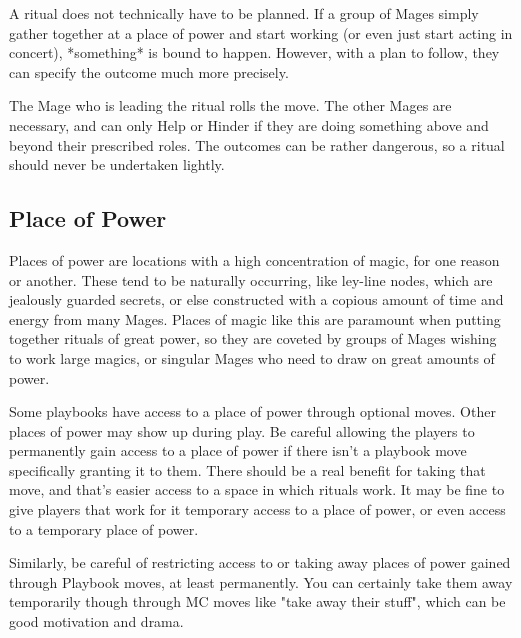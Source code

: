 \documentclass[
  oneside,
  statementpaper,
  9pt]{memoir}
\begin{document}
\begin{Player}
A ritual does not technically have to be planned. If a group of Mages simply gather together at a place of power and start working (or even just start acting in concert), *something* is bound to happen. However, with a plan to follow, they can specify the outcome much more precisely.

The Mage who is leading the ritual rolls the move. The other Mages are necessary, and can only Help or Hinder if they are doing something above and beyond their prescribed roles. The outcomes can be rather dangerous, so a ritual should never be undertaken lightly. 

\end{Player}

\hypertarget{place-of-power}{%
\subsection{Place of Power}\label{place-of-power}}

\begin{Narrator}

Places of power are locations with a high concentration of magic, for one reason or another. These tend to be naturally occurring, like ley-line nodes, which are jealously guarded secrets, or else constructed with a copious amount of time and energy from many Mages. Places of magic like this are paramount when putting together rituals of great power, so they are coveted by groups of Mages wishing to work large magics, or singular Mages who need to draw on great amounts of power. 

\end{Narrator}

\begin{MC}

Some playbooks have access to a place of power through optional moves. Other places of power may show up during play. Be careful allowing the players to permanently gain access to a place of power if there isn’t a playbook move specifically granting it to them. There should be a real benefit for taking that move, and that’s easier access to a space in which rituals work. It may be fine to give players that work for it temporary access to a place of power, or even access to a temporary place of power.

Similarly, be careful of restricting access to or taking away places of power gained through Playbook moves, at least permanently. You can certainly take them away temporarily though through MC moves like "take away their stuff", which can be good motivation and drama.

\end{MC}
\end{document}
